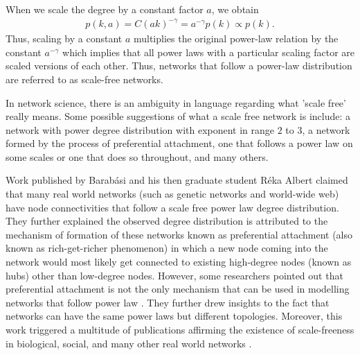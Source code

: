 \documentclass[10pt,a4paper]{article}
\theoremstyle{plain}
\theoremstyle{definition}
\begin{document}
When we scale the degree by a constant factor $a$, we obtain
\begin{eqnarray}
p(k,a) = C(ak)^{-\gamma} = a^{-\gamma} p(k) \propto p(k).
\label{scale}
\end{eqnarray}
Thus, scaling by a constant $a$ multiplies the original power-law relation by the constant $a^{-\gamma}$ which implies that all power laws with a particular scaling factor are scaled versions of each other. Thus, networks that follow a power-law distribution are referred to as scale-free networks.

In network science, there is an ambiguity in language regarding what 'scale free' really means. Some possible suggestions of what a scale free network is include: a network with power degree distribution with exponent in range $2$ to $3$, a network formed by the process of preferential attachment, one that follows a power law on some scales or one that does so throughout, and many others. 

Work published by Barab\'{a}si and his then graduate student R\'{e}ka Albert \citep{banavar1999size} claimed that many real world networks (such as genetic networks and world-wide web) have node connectivities that follow a scale free power law degree distribution. They further explained the observed degree distribution is attributed to the mechanism of formation of these networks known as preferential attachment (also known as rich-get-richer phenomenon) in which a new node coming into the network would most likely get connected to existing high-degree nodes (known as hubs) other than low-degree nodes. However, some researchers pointed out that preferential attachment is not the only mechanism that can be used in modelling networks that follow power law \citep{colman2013complex}. They further drew insights to the fact that networks can have the same power laws but different topologies. Moreover, this work triggered a multitude of publications affirming the existence of scale-freeness in biological, social, and many other real world networks \citep{jasny2003life,alon2003biological,cohen2002all,bray2003molecular}.
\end{document}
